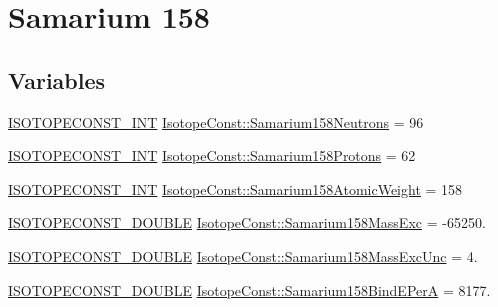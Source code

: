 \hypertarget{group___isotope_const-_samarium-_sm158}{}\section{Samarium 158}
\label{group___isotope_const-_samarium-_sm158}
\subsection*{Variables}
\begin{DoxyCompactItemize}
\item 
\mbox{\hyperlink{group___isotope_const-_macros_ga5f18360b3e99483a35c32d789e62621c}{I\+S\+O\+T\+O\+P\+E\+C\+O\+N\+S\+T\+\_\+\+I\+NT}} \mbox{\hyperlink{group___isotope_const-_samarium-_sm158_gabf15fe8258e95c0a20aa92897610ac8d}{Isotope\+Const\+::\+Samarium158\+Neutrons}} = 96
\item 
\mbox{\hyperlink{group___isotope_const-_macros_ga5f18360b3e99483a35c32d789e62621c}{I\+S\+O\+T\+O\+P\+E\+C\+O\+N\+S\+T\+\_\+\+I\+NT}} \mbox{\hyperlink{group___isotope_const-_samarium-_sm158_ga033c501cc7966a512b79cc43df67de79}{Isotope\+Const\+::\+Samarium158\+Protons}} = 62
\item 
\mbox{\hyperlink{group___isotope_const-_macros_ga5f18360b3e99483a35c32d789e62621c}{I\+S\+O\+T\+O\+P\+E\+C\+O\+N\+S\+T\+\_\+\+I\+NT}} \mbox{\hyperlink{group___isotope_const-_samarium-_sm158_ga503e90627eaa535be1b03db143c5b664}{Isotope\+Const\+::\+Samarium158\+Atomic\+Weight}} = 158
\item 
\mbox{\hyperlink{group___isotope_const-_macros_ga8f45a7272ce02c0b4c65c44636ed719a}{I\+S\+O\+T\+O\+P\+E\+C\+O\+N\+S\+T\+\_\+\+D\+O\+U\+B\+LE}} \mbox{\hyperlink{group___isotope_const-_samarium-_sm158_gae204282328050c73d0fd821b10f55c15}{Isotope\+Const\+::\+Samarium158\+Mass\+Exc}} = -\/65250.
\item 
\mbox{\hyperlink{group___isotope_const-_macros_ga8f45a7272ce02c0b4c65c44636ed719a}{I\+S\+O\+T\+O\+P\+E\+C\+O\+N\+S\+T\+\_\+\+D\+O\+U\+B\+LE}} \mbox{\hyperlink{group___isotope_const-_samarium-_sm158_ga5c5c23517a94669669cee2908171fbe8}{Isotope\+Const\+::\+Samarium158\+Mass\+Exc\+Unc}} = 4.
\item 
\mbox{\hyperlink{group___isotope_const-_macros_ga8f45a7272ce02c0b4c65c44636ed719a}{I\+S\+O\+T\+O\+P\+E\+C\+O\+N\+S\+T\+\_\+\+D\+O\+U\+B\+LE}} \mbox{\hyperlink{group___isotope_const-_samarium-_sm158_gab9d4c027e47e63f5ba3208f109a30181}{Isotope\+Const\+::\+Samarium158\+Bind\+E\+PerA}} = 8177.
\item 

\end{DoxyCompactItemize}
